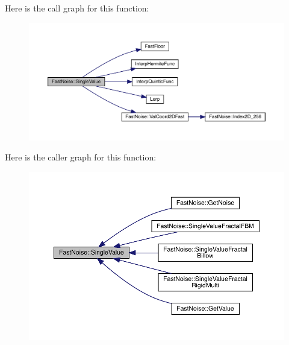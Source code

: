 Here is the call graph for this function\+:
\nopagebreak
\begin{figure}[H]
\begin{center}
\leavevmode
\includegraphics[width=350pt]{d1/dd8/class_fast_noise_a9704c1a9f62ad5fcf8e42b15ad8df389_cgraph}
\end{center}
\end{figure}
Here is the caller graph for this function\+:
\nopagebreak
\begin{figure}[H]
\begin{center}
\leavevmode
\includegraphics[width=350pt]{d1/dd8/class_fast_noise_a9704c1a9f62ad5fcf8e42b15ad8df389_icgraph}
\end{center}
\end{figure}
\mbox{\label{class_fast_noise_a982fae6250ecadc33331384167fcbc2d}} 

